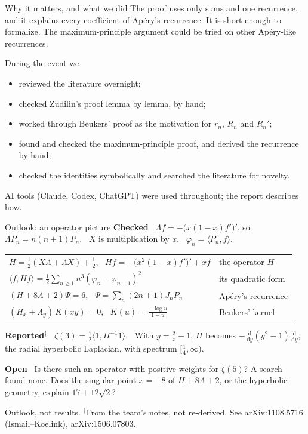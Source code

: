 \documentclass[aspectratio=169,11pt]{beamer}
\newcommand{\dd}{\,\mathrm{d}}
\begin{document}
\begin{frame}{Why it matters, and what we did}
  The proof uses only sums and one recurrence, and it explains every coefficient of Ap\'ery's
  recurrence. It is short enough to formalize. The maximum-principle argument could be tried
  on other Ap\'ery-like recurrences.

  During the event we
  \begin{itemize}
    \item reviewed the literature overnight;
    \item checked Zudilin's proof lemma by lemma, by hand;
    \item worked through Beukers' proof as the motivation for $r_n$, $R_n$ and $R_n'$;
    \item found and checked the maximum-principle proof, and derived the recurrence by hand;
    \item checked the identities symbolically and searched the literature for novelty.
  \end{itemize}
  AI tools (Claude, Codex, ChatGPT) were used throughout; the report describes how.
\end{frame}

\begin{frame}{Outlook: an operator picture}
  \small
  \textbf{\color{mDarkTeal}Checked} \
  $\Lambda f=-\bigl(x(1-x)f'\bigr)'$, so $\Lambda P_n=n(n+1)P_n$. \ $X$ is multiplication by $x$. \ $\varphi_n=\langle P_n,f\rangle$.

  \renewcommand{\arraystretch}{1.2}
  \begin{tabular}{@{}l@{\quad}l@{}}
    $H=\tfrac12(X\Lambda+\Lambda X)+\tfrac12$, \ $Hf=-\bigl(x^2(1-x)f'\bigr)'+xf$ & the operator $H$\\
    $\langle f,Hf\rangle=\tfrac12\sum_{n\ge1}n^3(\varphi_n-\varphi_{n-1})^2$ & its quadratic form\\
    $(H+8\Lambda+2)\Psi=6$, \ $\Psi=\sum_n(2n+1)J_nP_n$ & Ap\'ery's recurrence\\
    $(H_x+\Lambda_y)\,K(xy)=0$, \ $K(u)=\frac{-\log u}{1-u}$ & Beukers' kernel
  \end{tabular}

  \textbf{\color{mLightBrown}Reported$^\dagger$} \
  $\zeta(3)=\tfrac12\langle1,H^{-1}1\rangle$. \ With $y=\frac2x-1$, $H$ becomes
  $-\frac{\dd}{\dd y}(y^2-1)\frac{\dd}{\dd y}$, the radial hyperbolic Laplacian, with spectrum
  $[\frac14,\infty)$.

  \textbf{\color{mLightBrown}Open} \
  Is there such an operator with positive weights for $\zeta(5)$? A search found none.
  Does the singular point $x=-8$ of $H+8\Lambda+2$, or the hyperbolic geometry, explain $17+12\sqrt2$?

  {\footnotesize Outlook, not results. $^\dagger$From the team's notes, not re-derived.
  See arXiv:1108.5716 (Ismail--Koelink), arXiv:1506.07803.}
\end{frame}
\end{document}

